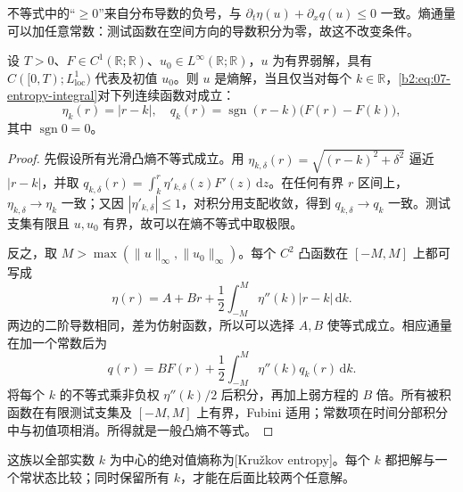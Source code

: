 不等式中的“\(\geq0\)”来自分布导数的负号，与
\(\partial_t\eta(u)+\partial_xq(u)\leq0\) 一致。熵通量可以加任意常数：测试函数在空间方向的导数积分为零，故这不改变条件。

\begin{proposition}[Kružkov 熵族]\label{b2:prop:07-kruzkov-entropies}
设 \(T>0\)、\(F\in C^1(\mathbb R;\mathbb R)\)、\(u_0\in L^\infty(\mathbb R;\mathbb R)\)，\(u\) 为有界弱解，具有 \(C([0,T);L^1_{\mathrm{loc}})\) 代表及初值 \(u_0\)。则 \(u\) 是熵解，当且仅当对每个 \(k\in\mathbb R\)，\eqref{b2:eq:07-entropy-integral}对下列连续函数对成立：
\begin{equation}\label{b2:eq:07-kruzkov-pairs}
 \eta_k(r)=|r-k|,
 \quad q_k(r)=\operatorname{sgn}(r-k)\bigl(F(r)-F(k)\bigr),
\end{equation}
其中 \(\operatorname{sgn}0=0\)。
\end{proposition}
\begin{proof}
先假设所有光滑凸熵不等式成立。用
\(\eta_{k,\delta}(r)=\sqrt{(r-k)^2+\delta^2}\)
逼近 \(|r-k|\)，并取
\(q_{k,\delta}(r)=\int_k^r\eta'_{k,\delta}(z)F'(z)\,\mathrm dz\)。在任何有界 \(r\) 区间上，\(\eta_{k,\delta}\to\eta_k\) 一致；又因 \(|\eta'_{k,\delta}|\leq1\)，对积分用支配收敛，得到 \(q_{k,\delta}\to q_k\) 一致。测试支集有限且 \(u,u_0\) 有界，故可以在熵不等式中取极限。

反之，取 \(M>\max(\|u\|_\infty,\|u_0\|_\infty)\)。每个 \(C^2\) 凸函数在 \([-M,M]\) 上都可写成
\[
 \eta(r)=A+Br+\frac12\int_{-M}^M\eta''(k)|r-k|\,\mathrm dk.
\]
两边的二阶导数相同，差为仿射函数，所以可以选择 \(A,B\) 使等式成立。相应通量在加一个常数后为
\[
 q(r)=BF(r)+\frac12\int_{-M}^M\eta''(k)q_k(r)\,\mathrm dk.
\]
将每个 \(k\) 的不等式乘非负权 \(\eta''(k)/2\) 后积分，再加上弱方程的 \(B\) 倍。所有被积函数在有限测试支集及 \([-M,M]\) 上有界，Fubini 适用；常数项在时间分部积分中与初值项相消。所得就是一般凸熵不等式。
\end{proof}

这族以全部实数 \(k\) 为中心的绝对值熵称为[Kružkov entropy]。每个 \(k\) 都把解与一个常状态比较；同时保留所有 \(k\)，才能在后面比较两个任意解。

